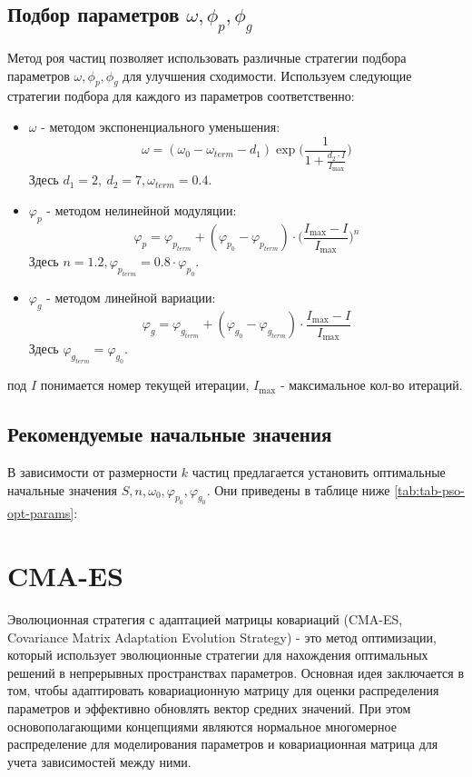 \subsection{Подбор параметров $\omega, \phi_p, \phi_g$}
Метод роя частиц позволяет использовать различные стратегии подбора параметров $\omega, \phi_p, \phi_g$ для улучшения сходимости.
Используем следующие стратегии подбора для каждого из параметров соответственно:
\begin{itemize}
	\item $\omega$ - методом экспоненциального уменьшения:
	\begin{equation}\label{eq:exp_decay}
		\omega = (\omega_{0} - \omega_{term} - d_1)\exp{\bigg(\frac{1}{1 + \frac{d_2\cdot I}{I_{\max}}}\bigg)}
	\end{equation}
	Здесь $d_1 = 2, \ d_2 = 7, \omega_{term} = 0.4$.
	\item $\varphi_p$ - методом нелинейной модуляции:
	\begin{equation}\label{eq:nonlin_mod}
		\varphi_p = \varphi_{p_{term}} + (\varphi_{p_{0}} - \varphi_{p_{term}}) \cdot \bigg(\frac{
		I_{\max} - I}{I_{\max}}\bigg)^n
	\end{equation}
	Здесь $n = 1.2, \varphi_{p_{term}} = 0.8 \cdot \varphi_{p_{0}}$.
	\item $\varphi_g$ - методом линейной вариации:
	\begin{equation}\label{eq:lin_variation}
		\varphi_g = \varphi_{g_{term}} +  (\varphi_{g_{0}} - \varphi_{g_{term}}) \cdot \frac{I_{\max} - I}{I_{\max}}
	\end{equation}
	Здесь $\varphi_{g_{term}} = \varphi_{g_{0}}$.
\end{itemize}
под $I$ понимается номер текущей итерации, $I_{\max}$ - максимальное кол-во итераций.
\subsection{Рекомендуемые начальные значения}
В зависимости от размерности $k$ частиц предлагается установить оптимальные начальные значения $S, n, \omega_0, \varphi_{p_{0}}, \varphi_{g_{0}}$.
Они приведены в таблице ниже \ref{tab:tab-pso-opt-params}:

\newpage
\section{CMA-ES}
 Эволюционная стратегия с адаптацией матрицы ковариаций (CMA-ES, Covariance Matrix Adaptation Evolution Strategy) - это метод оптимизации, который использует эволюционные стратегии для нахождения оптимальных решений в непрерывных пространствах параметров. Основная идея заключается в том, чтобы адаптировать ковариационную матрицу для оценки распределения параметров и эффективно обновлять вектор средних значений. При этом основополагающими концепциями являются нормальное многомерное распределение для моделирования параметров и ковариационная матрица для учета зависимостей между ними.
